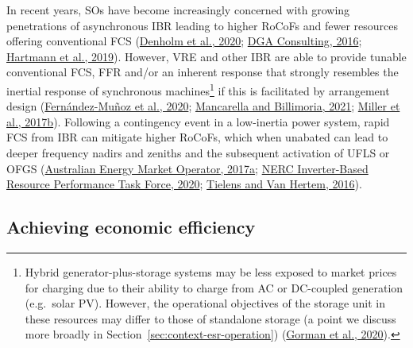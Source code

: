 \documentclass[12pt,a4paper,]{report}
\begin{document}
In recent years, SOs have become increasingly concerned with growing
penetrations of asynchronous IBR leading to higher RoCoFs and fewer
resources offering conventional FCS
(\protect\hyperlink{ref-denholmInertiaPowerGrid2020}{Denholm et al.,
2020};
\protect\hyperlink{ref-dgaconsultingInternationalReviewFrequency2016}{DGA
Consulting, 2016};
\protect\hyperlink{ref-hartmannEffectsDecreasingSynchronous2019}{Hartmann
et al., 2019}). However, VRE and other IBR are able to provide tunable
conventional FCS, FFR and/or an inherent response that strongly
resembles the inertial response of synchronous machines\footnote{Hybrid
  generator-plus-storage systems may be less exposed to market prices
  for charging due to their ability to charge from AC or DC-coupled
  generation (e.g.~solar PV). However, the operational objectives of the
  storage unit in these resources may differ to those of standalone
  storage (a point we discuss more broadly in
  Section~\ref{sec:context-esr-operation})
  (\protect\hyperlink{ref-gormanMotivationsOptionsDeploying2020}{Gorman
  et al., 2020}).} if this is facilitated by arrangement design
(\protect\hyperlink{ref-fernandez-munozFastFrequencyControl2020}{Fernández-Muñoz
et al., 2020};
\protect\hyperlink{ref-mancarellaFragileGridPhysics2021}{Mancarella and
Billimoria, 2021};
\protect\hyperlink{ref-millerTechnologyCapabilitiesFast2017}{Miller et
al., 2017b}). Following a contingency event in a low-inertia power
system, rapid FCS from IBR can mitigate higher RoCoFs, which when
unabated can lead to deeper frequency nadirs and zeniths and the
subsequent activation of UFLS or OFGS
(\protect\hyperlink{ref-australianenergymarketoperatorFastFrequencyResponse2017}{Australian
Energy Market Operator, 2017a};
\protect\hyperlink{ref-nercinverter-basedresourceperformancetaskforceFastFrequencyResponse2020}{NERC
Inverter-Based Resource Performance Task Force, 2020};
\protect\hyperlink{ref-tielensRelevanceInertiaPower2016}{Tielens and Van
Hertem, 2016}).

\hypertarget{sec:fcs-efficiency-challenges}{%
\subsection{Achieving economic
efficiency}\label{sec:fcs-efficiency-challenges}}
\end{document}
